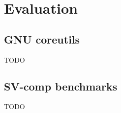 \section{Evaluation}
\label{sec:eval}

  \subsection{GNU coreutils}
  \label{sec:eval:coreutils}
  TODO \cite{gnuCoreutils}

  \subsection{SV-comp benchmarks}
  \label{sec:eval:sv-comp}
  TODO \cite{svBench}